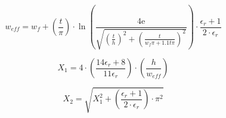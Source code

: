 \begin{equation}\label{eq:weff}
w_{eff} = w_{f}+\left(\frac{t}{\pi} \right) \cdot \ln \left(\frac{4\text{e}}{\sqrt{\left(\frac{t}{h}\right)^2+\left(\frac{t}{w_{f}\pi+1.1t\pi}\right)^2}}\right)\cdot \frac{\epsilon_r+1}{2\cdot \epsilon_r}
\end{equation}
\begin{where}
\end{where}

\begin{equation}\label{eq:x1}
X_1 = 4\cdot \left(\frac{14 \epsilon_r +8}{11 \epsilon_r}\right)\cdot \left(\frac{h}{w_{eff}}\right)
\end{equation}

\begin{equation}\label{eq:x2}
X_2 = \sqrt{X_1^2+\left(\frac{\epsilon_r+1}{2\cdot \epsilon_r}\right)\cdot\pi^2}
\end{equation}






